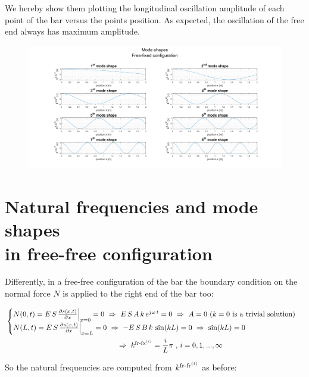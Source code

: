 \documentclass[a4paper,12pt,oneside]{article}
\begin{document}
We hereby show them plotting the longitudinal oscillation amplitude of each point of the bar versus the points position. As expected, the oscillation of the free end always has maximum amplitude.

\begin{figure}[h]
	\hspace{-70pt}
	\includegraphics[scale=0.4]{mode_shapes_free_fixed}
\end{figure}


\section{Natural frequencies and mode shapes \\ in free-free configuration}

Differently, in a free-free configuration of the bar the boundary condition on the normal force $ N $ is applied to the right end of the bar too:

\[ \begin{split}
	& \begin{cases}
			N(0,t) = E \, S \, \frac{\partial s(x,t)}{\partial x}\Big|_{x=0} = 0
				~ \Rightarrow ~ E \, S \, A \, k \, e^{j \omega \, t} = 0
				~ \Rightarrow ~ A = 0 ~ \text{($ k = 0 $ is a trivial solution)} \\
			N(L,t) = E \, S \, \frac{\partial s(x,t)}{\partial x}\Big|_{x=L} = 0
				~ \Rightarrow ~ - E \, S \, B \, k \, \sin(kL) = 0 ~ \Rightarrow ~ \sin(kL) = 0
	\end{cases}	\\
	& \hspace{150pt} ~ \Rightarrow ~
		k^{\textup{fr-fx}^{(i)}} = \frac{i}{L} \pi ~ \text{,} ~ i = 0,1,...,\infty
\end{split} \]

So the natural frequencies are computed from $ k^{\textup{fr-fr}^{(i)}} $ as before:
\end{document}
